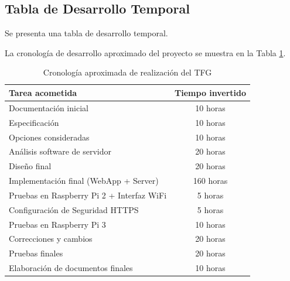 \begin{appendices}
\clearpage
{}%
\begin{center}
\begin{minipage}{.75\textwidth}
\section{Tabla de Desarrollo Temporal}\label{ApendiceF}

Se presenta una tabla de desarrollo temporal.
\end{minipage}
\end{center}
\clearpage%

La cronología de desarrollo aproximado del proyecto se muestra en la Tabla \ref{tablaTFG}.

\begin{table}[!ht]
\begin{center}
\begin{tabular}{ | l | c | }
\hline
\textbf{Tarea acometida} & \textbf{Tiempo invertido} \\
\hline
Documentación inicial & 10 horas \\ \hline
Especificación & 10 horas \\ \hline
Opciones consideradas & 10 horas \\ \hline
Análisis software de servidor & 20 horas \\ \hline
Diseño final & 20 horas \\ \hline
Implementación final (WebApp + Server) & 160 horas \\ \hline
Pruebas en Raspberry Pi 2 + Interfaz WiFi & 5 horas \\ \hline
Configuración de Seguridad HTTPS & 5 horas \\ \hline
Pruebas en Raspberry Pi 3 & 10 horas \\ \hline
Correcciones y cambios & 20 horas \\ \hline
Pruebas finales & 20 horas \\ \hline
Elaboración de documentos finales & 10 horas \\ \hline
\end{tabular}
\end{center}
\caption{Cronología aproximada de realización del TFG}
\label{tablaTFG}
\end{table}%

\end{appendices}